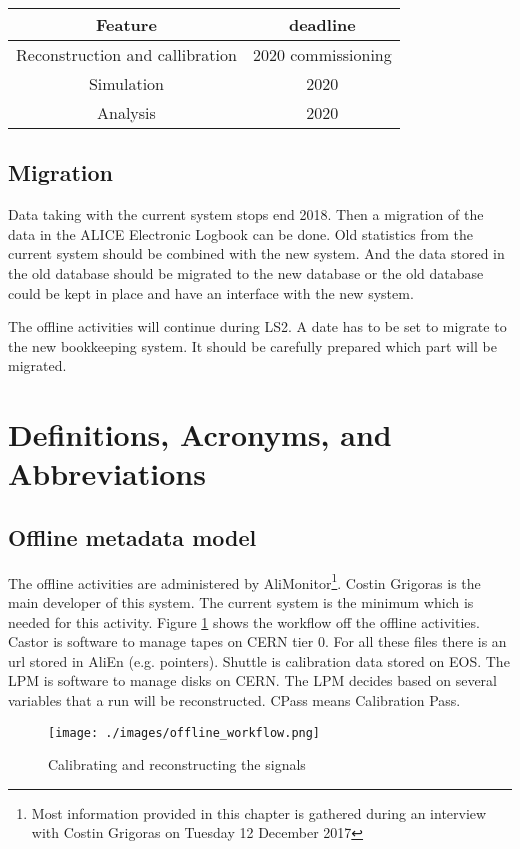 \begin{tabular}{cc}
\hline
Feature & deadline\\
\hline
\hline
 Reconstruction and callibration  & 2020 commissioning \\
 \hline
Simulation   & 2020\\
\hline
Analysis & 2020\\
\hline
\end{tabular}

\subsection{Migration}
Data taking with the current system stops end 2018. Then a migration of the data in the ALICE Electronic Logbook can be done. Old statistics from the current system should be combined with the new system. And the data stored in the old database should be migrated to the new database or the old database could be kept in place and have an interface with the new system. 

The offline activities will continue during LS2. A date has to be set to migrate to the new bookkeeping system. It should be carefully prepared which part will be migrated.

\section{Definitions, Acronyms, and Abbreviations}

\subsection{Offline metadata model}
The offline activities are administered by AliMonitor\footnote{Most information provided in this chapter is gathered during an interview with Costin Grigoras on Tuesday 12 December 2017}. Costin Grigoras is the main developer of this system. The current system is the minimum which is needed for this activity. Figure \ref{fig:offlineWorkflow} shows the workflow off the offline activities. Castor is software to manage tapes on CERN tier 0. For all these files there is an url stored in AliEn (e.g. pointers). Shuttle is calibration data stored on EOS. The LPM is software to manage disks on CERN. The LPM decides based on several variables that a run will be reconstructed. CPass means Calibration Pass. 

\begin{figure}[h]
  \begin{center}
    \texttt{[image: ./images/offline\_workflow.png]}
    \caption{Calibrating and reconstructing the signals}
    \label{fig:offlineWorkflow}
  \end{center}
\end{figure}


